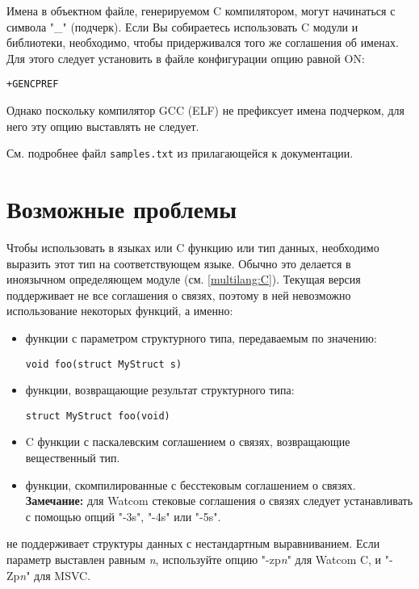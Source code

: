 Имена в объектном файле, генерируемом C компилятором, могут начинаться
с символа "\_" (подчерк). Если Вы собираетесь использовать C модули
и библиотеки, необходимо, чтобы \XDS{} придерживался того же соглашения 
об именах. Для этого следует установить в файле конфигурации опцию
 равной ON:

\verb'+GENCPREF'

\iflinux
Однако поскольку компилятор GCC (ELF) не префиксует имена подчерком,
для него эту опцию выставлять не следует.
\fi

См. подробнее файл {\tt samples.txt} из прилагающейся к \XDS{} 
документации.

\section{Возможные проблемы}

Чтобы использовать в языках \mt{} или \ot{} C функцию или тип данных,
необходимо выразить этот тип на соответствующем языке. Обычно это
делается в иноязычном определяющем модуле (см. \ref{multilang:C}).
Текущая версия \XDS{} поддерживает не все соглашения о связях,
поэтому в ней невозможно использование некоторых функций, а именно:
\begin{itemize}
\item функции с параметром структурного типа, передаваемым по значению:
\begin{verbatim}
void foo(struct MyStruct s)
\end{verbatim}

\item функции, возвращающие результат структурного типа:
\begin{verbatim}
struct MyStruct foo(void)
\end{verbatim}

\item C функции с паскалевским соглашением о связях, возвращающие 
      вещественный тип.

\iflinux \else %
\item функции, скомпилированные с бесстековым соглашением о связях.
      {\bf Замечание:} для Watcom стековые соглашения о связях следует
      устанавливать с помощью опций
      "-3s", "-4s" или "-5s".
\fi
\end{itemize}

\iflinux \else %
\XDS{} не поддерживает структуры данных с нестандартным выравниванием.
Если параметр  выставлен равным {\em n}, 
используйте опцию
"-zp{\em n}" для Watcom C, и "-Zp{\em n}" для MSVC.
\fi

